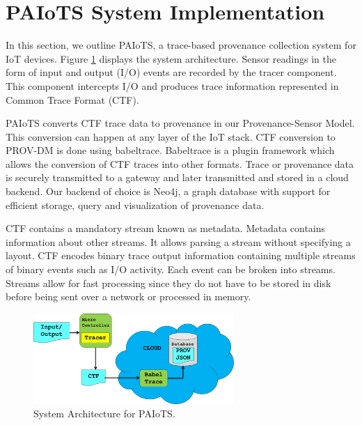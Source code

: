 \documentclass[conference]{IEEEtran}
\begin{document}
\section{PAIoTS System Implementation}
In this section, we outline  PAIoTS, a trace-based provenance collection system for IoT devices. Figure \ref{architecture} displays the system architecture. Sensor readings in the form of input and output (I/O) events are recorded by the tracer component. This component intercepts I/O and produces trace information represented in Common Trace Format (CTF). 


PAIoTS converts CTF trace data to provenance in our Provenance-Sensor Model. This conversion can happen at any layer of the IoT stack. CTF conversion to PROV-DM is done using babeltrace. Babeltrace is a plugin framework which allows the conversion of CTF traces into other formats. Trace or provenance data is securely transmitted to a gateway and later transmitted and stored in a cloud backend. Our backend of choice is Neo4j, a graph database with support for efficient storage, query and visualization of provenance data. 

\par CTF contains a mandatory stream known as metadata. Metadata contains information about other streams. It allows parsing a stream without specifying a layout. CTF encodes binary trace output information containing multiple streams of binary events such as I/O activity. Each event can be broken into streams. Streams allow for fast processing since they do not have to be stored in disk before being sent over a network or processed in memory.





\begin{figure}[h!]
\begin{center}

\includegraphics[width =3.0in]{system_architecture.PNG}    
\end{center}
\caption{System Architecture for PAIoTS.}
\label{architecture}
\end{figure}
\end{document}
